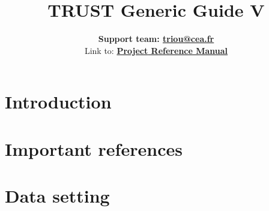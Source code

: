 \documentclass[a4paper,11pt,english]{report}
\def\TRUSTVERSION{}
\def\TRUSTVERSION{V\TRUSTV}
\def \REFERENCEMANUAL {TRUST_Reference_Manual.pdf}
\newcommand{\trustref}{\textbf{Project}\xspace}
\begin{document}
\title{\vspace{2cm}\Huge \bfseries{TRUST Generic Guide \TRUSTVERSION}}
\author{
\vspace{2cm} %
\LARGE \textbf{Support team: \href{mailto:triou@cea.fr}{triou@cea.fr}} \\
\vspace{1cm} %
Link to: \LARGE \textbf{\href{run:\REFERENCEMANUAL}{\trustref Reference Manual}}\\
}

\maketitle
\tableofcontents{}
\newpage


%
\chapter{Introduction}
%




%
\chapter{Important references}
%




%
\chapter{Data setting}
%

\end{document}
